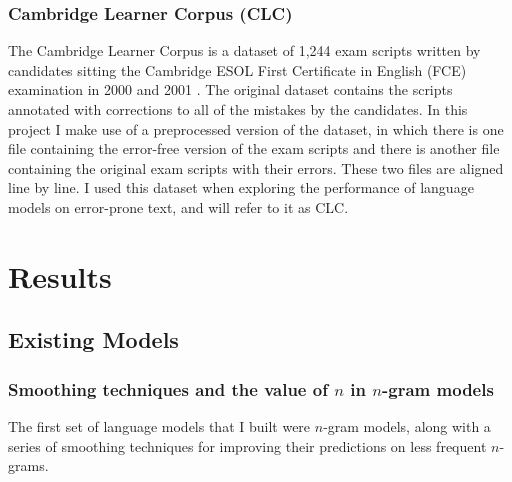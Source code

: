 \documentclass[a4paper, 12pt]{report}
\begin{document}
\subsubsection{Cambridge Learner Corpus (CLC)}

The Cambridge Learner Corpus is a dataset of 1,244 exam scripts written by candidates sitting the Cambridge ESOL First Certificate in English (FCE) examination in 2000 and 2001 \cite{clc:yannakoudakis2011}. The original dataset contains the scripts annotated with corrections to all of the mistakes by the candidates. In this project I make use of a preprocessed version of the dataset, in which there is one file containing the error-free version of the exam scripts and there is another file containing the original exam scripts with their errors. These two files are aligned line by line. I used this dataset when exploring the performance of language models on error-prone text, and will refer to it as CLC.

\section{Results}

\subsection{Existing Models}

\subsubsection*{Smoothing techniques and the value of $n$ in $n$-gram models}

The first set of language models that I built were $n$-gram models, along with a series of smoothing techniques for improving their predictions on less frequent $n$-grams.
\end{document}
